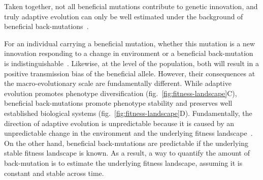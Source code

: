 \documentclass{article}
\begin{document}
    Taken together, not all beneficial mutations contribute to genetic innovation, and truly adaptive evolution can only be well estimated under the background of beneficial back-mutations~\cite{keightley_what_2010, rice_evolutionarily_2015}.

    For an individual carrying a beneficial mutation, whether this mutation is a new innovation responding to a change in environment or a beneficial back-mutation is indistinguishable~\cite{charlesworth_other_2007}.
    Likewise, at the level of the population, both will result in a positive transmission bias of the beneficial allele.
    However, their consequences at the macro-evolutionary scale are fundamentally different.
    While adaptive evolution promotes phenotype diversification (fig.~\ref{fig:fitness-landscape}C), beneficial back-mutations promote phenotype stability and preserves well established biological systems (fig.~\ref{fig:fitness-landscape}D).
    Fundamentally, the direction of adaptive evolution is unpredictable because it is caused by an unpredictable change in the environment and the underlying fitness landscape~\cite{bazykin_changing_2015}.
    On the other hand, beneficial back-mutations are predictable if the underlying stable fitness landscape is known.
    As a result, a way to quantify the amount of back-mutation is to estimate the underlying fitness landscape, assuming it is constant and stable across time.
\end{document}
